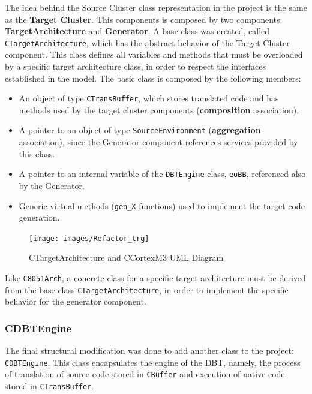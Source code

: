 The idea behind the Source Cluster class representation in the project is the same as the \textbf{Target Cluster}. This components is composed by two components: \textbf{TargetArchitecture} and \textbf{Generator}. A base class was created, called \texttt{CTargetArchitecture}, which has the abstract behavior of the Target Cluster component. This class defines all variables and methods that must be overloaded by a specific target architecture class, in order to respect the interfaces established in the model.  The basic class is composed by the following members:

\begin{itemize}
\item An object of type \texttt{CTransBuffer}, which stores translated code and has methods used by the target cluster components (\textbf{composition} association).
\item A pointer to an object of type \texttt{SourceEnvironment} (\textbf{aggregation} association), since the Generator component references services provided by this class.
\item A pointer to an internal variable of the \texttt{DBTEngine} class, \texttt{eoBB}, referenced also by the Generator.
\item Generic virtual methods (\texttt{gen\_X} functions) used to implement the target code generation. 
\end{itemize}

\begin{figure}[H]
\centerline{
\texttt{[image: images/Refactor\_trg]}
}
\caption{CTargetArchitecture and CCortexM3 UML Diagram}
\label{fig:refactortrg} 
\end{figure}


Like \texttt{C8051Arch}, a concrete class for a specific target architecture must be derived from the base class \texttt{CTargetArchitecture}, in order to implement the specific behavior for the generator component. 


\subsubsection*{CDBTEngine}

The final structural modification was done to add another class to the project: \texttt{CDBTEngine}. This class encapsulates the engine of the DBT, namely, the process of translation of source code stored in \texttt{CBuffer} and execution of native code stored in \texttt{CTransBuffer}. 

